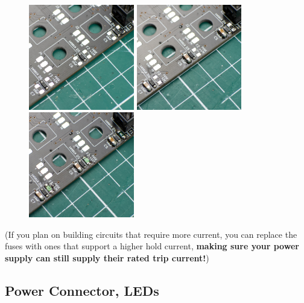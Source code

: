 \documentclass[12pt, a4paper]{article}
\begin{document}
\begin{figure}[H]
    \centering
    \includegraphics[width=46mm]{images/section_1-1_diodes.jpg}
    \hspace{2mm}
    \includegraphics[width=46mm]{images/section_1-1_capacitors.jpg}
    \hspace{2mm}
    \includegraphics[width=46mm]{images/section_1-1_fuses.jpg}
\end{figure}

\begin{quoting}
    \small
    (If you plan on building circuits that require more current, you can replace the fuses with
    ones that support a higher hold current, \textbf{making sure your power supply can still
    supply their rated trip current!})
\end{quoting}

\subsection{Power Connector, LEDs}
\end{document}
